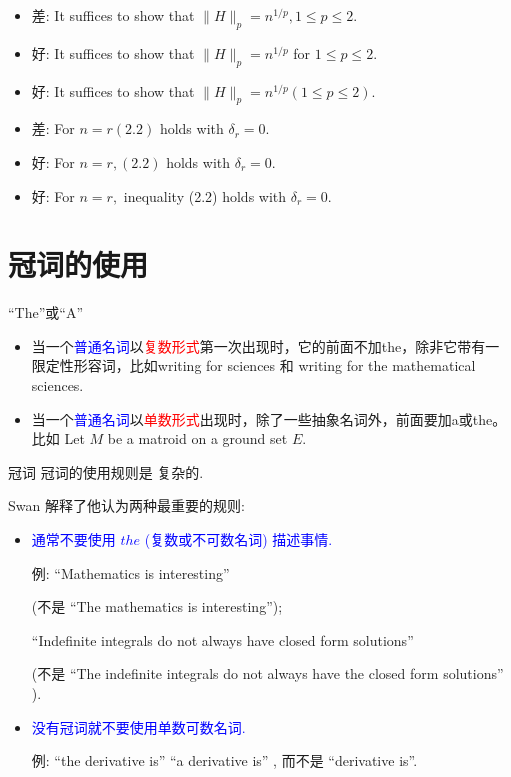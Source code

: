 \documentclass{ctexbeamer}
\newcommand{\red}[1]{\textcolor{red}{#1}}
\newcommand{\blue}[1]{\textcolor{blue}{#1}}
\begin{document}
\begin{frame}
	\begin{itemize}
	\item
差: It suffices to show that $\|H\|_{p}=n^{1 / p}, 1 \leqslant p \leqslant 2$. \pause
	\item
好: It suffices to show that $\|H\|_{p}=n^{1 / p}$ for $1 \leqslant p \leqslant 2$.
\item
好: It suffices to show that $\|H\|_{p}=n^{1 / p}(1 \leqslant p \leqslant 2)$.
	\end{itemize}
\vspace{10pt}

\begin{itemize}
	\item
差: For $n=r(2.2)$ holds with $\delta_{r}=0$. \pause
\item
好: For $n=r,(2.2)$ holds with $\delta_{r}=0 .$
\item
好: For $n=r,$ inequality (2.2) holds with $\delta_{r}=0$.
	\end{itemize}

\end{frame}
\section{{冠词}的使用}
\begin{frame}{``The''或``A''}

    \begin{itemize}
        \item  当一个\blue{普通名词}以\red{复数形式}第一次出现时，它的前面不加the，除非它带有一限定性形容词，比如writing for sciences 和 writing for the mathematical sciences.
        \item 当一个\blue{普通名词}以\red{单数形式}出现时，除了一些抽象名词外，前面要加a或the。
        比如   Let $M$ be a matroid on a ground set $E$.

    \end{itemize}
\end{frame}


\begin{frame}{冠词}
冠词的使用规则是 复杂的.


{Swan} 解释了他认为两种最重要的规则:

\begin{itemize}
    \item \blue{通常不要使用 $t h e$ (复数或不可数名词) 描述事情. }

    例: ``Mathematics is interesting''

    (不是 ``The mathematics is interesting'');

    ``Indefinite integrals do not always have closed form solutions''

    (不是 ``The indefinite integrals do not always have the closed form solutions'' ).

    \item \blue{没有冠词就不要使用单数可数名词.}

    例: ``the derivative is'' ``a derivative is'' , 而不是 ``derivative is''.
\end{itemize}
\end{frame}
\end{document}
